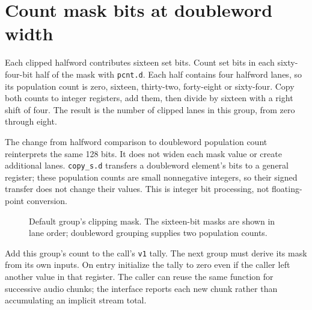 \section{Count mask bits at doubleword width}\label{pcm-counting}
Each clipped halfword contributes sixteen set bits. Count set bits in each
sixty-four-bit half of the mask with \texttt{pcnt.d}. Each half contains four
halfword lanes, so its population count is zero, sixteen, thirty-two, forty-eight
or sixty-four. Copy both counts to integer registers, add them, then divide by
sixteen with a right shift of four. The result is the number of clipped lanes in
this group, from zero through eight.

The change from halfword comparison to doubleword population count reinterprets
the same 128 bits. It does not widen each mask value or create additional lanes.
\texttt{copy\_s.d} transfers a doubleword element's bits to a general register;
these population counts are small nonnegative integers, so their signed transfer
does not change their values. This is integer bit processing, not floating-point
conversion.

\begin{figure}[htbp]
  \centering
  \caption{Default group's clipping mask. The sixteen-bit masks are shown in lane order; doubleword grouping supplies two population counts.}
\end{figure}

Add this group's count to the call's \texttt{v1} tally. The next group must derive
its mask from its own inputs. On entry initialize the tally to zero even if the
caller left another value in that register. The caller can reuse the same function
for successive audio chunks; the interface reports each new chunk rather than
accumulating an implicit stream total.
